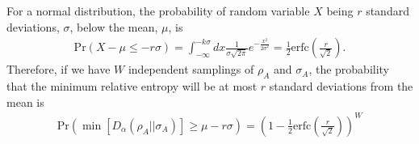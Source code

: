 \documentclass[a4paper,11pt]{article}
\newcommand*{\JKF}[1]{\textcolor{blue}{[JKF: #1]}}
\newcommand*{\SR}[1]{\textcolor{magenta}{[SR: \textsf{#1}]}}
\begin{document}
For a normal distribution, the probability of random variable $X$ being $r$ standard deviations, $\sigma$, below the mean, $\mu$, is
\begin{align}
    \mbox{Pr}(X-\mu \leq -r {\sigma}) = \int_{-\infty}^{-k{\sigma}}dx \frac{1}{\sigma\sqrt{2\pi}}e^{-\frac{x^2}{2\sigma^2}} = \frac{1}{2} \text{erfc}\left(\frac{r}{\sqrt{2}}\right).
\end{align}
Therefore, if we have $W$ independent samplings of $\rho_A$ and $\sigma_A$, 
the probability that the minimum relative entropy will be at most $r$ standard deviations from the mean is
\begin{align}
    \mbox{Pr}\left(\min\left[{D}_{\alpha}(\rho_A||\sigma_A)\right] \geq \mu - r\sigma\right) = \left(1- \frac{1}{2} \text{erfc}\left(\frac{r}{\sqrt{2}}\right)\right)^W
    \label{chernoff_prob}
\end{align}
\end{document}
